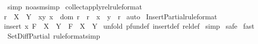 \begin{isabellebody}
\ {\isacharparenleft}simp\ {\isacharparenleft}no{\isacharunderscore}asm{\isacharunderscore}simp{\isacharparenright}{\isacharparenright}\isanewline
{}\isamarkupfalse%
%
\endisatagproof
{\isafoldproof}%
%
\isadelimproof
\isanewline
%
\endisadelimproof
\isanewline
{}\isamarkupfalse%
\ collect{\isacharunderscore}apply{\isacharunderscore}rel{\isacharbrackleft}rule{\isacharunderscore}format{\isacharbrackright}{\isacharcolon}\ \isanewline
{\isachardoublequoteopen}r\ {\isacharcolon}\ {\isacharparenleft}X\ {\isacharminus}{\isacharbar}{\isacharminus}{\isachargreater}\ Y{\isacharparenright}\ {\isacharminus}{\isacharminus}{\isachargreater}\ {\isacharbraceleft}{\isacharparenleft}x{\isacharcomma}y{\isacharparenright}{\isachardot}\ x\ {\isacharcolon}\ dom\ r\ {\isacharampersand}\ {\isacharparenleft}r\ {\isacharpercent}{\isacharcircum}\ x{\isacharparenright}\ {\isacharequal}\ y{\isacharbraceright}\ {\isacharequal}\ r{\isachardoublequoteclose}\isanewline
%
\isadelimproof
%
\endisadelimproof
%
\isatagproof
{}\isamarkupfalse%
\ auto\isanewline
{}\isamarkupfalse%
%
\endisatagproof
{\isafoldproof}%
%
\isadelimproof
\isanewline
%
\endisadelimproof
\isanewline
{}\isamarkupfalse%
\ Insert{\isacharunderscore}Partial{\isacharbrackleft}rule{\isacharunderscore}format{\isacharbrackright}{\isacharcolon}\ \isanewline
{\isachardoublequoteopen}{\isacharparenleft}{\isacharparenleft}insert\ x\ F{\isacharparenright}\ {\isacharcolon}\ {\isacharparenleft}X\ {\isacharminus}{\isacharbar}{\isacharminus}{\isachargreater}\ Y{\isacharparenright}{\isacharparenright}\ {\isacharminus}{\isacharminus}{\isachargreater}\ {\isacharparenleft}F\ {\isacharcolon}\ {\isacharparenleft}X\ {\isacharminus}{\isacharbar}{\isacharminus}{\isachargreater}\ Y{\isacharparenright}{\isacharparenright}{\isachardoublequoteclose}\isanewline
%
\isadelimproof
%
\endisadelimproof
%
\isatagproof
{}\isamarkupfalse%
\ {\isacharparenleft}unfold\ pfun{\isacharunderscore}def\ insert{\isacharunderscore}def\ rel{\isacharunderscore}def{\isacharparenright}\isanewline
{}\isamarkupfalse%
\ simp\isanewline
{}\isamarkupfalse%
\ safe\isanewline
{}\isamarkupfalse%
\ fast{\isacharplus}\isanewline
{}\isamarkupfalse%
%
\endisatagproof
{\isafoldproof}%
%
\isadelimproof
\isanewline
%
\endisadelimproof
\isanewline
{}\isamarkupfalse%
\ Set{\isacharunderscore}Diff{\isacharunderscore}Partial\ {\isacharbrackleft}rule{\isacharunderscore}format{\isacharcomma}simp{\isacharbrackright}{\isacharcolon}\ \isanewline

\end{isabellebody}
